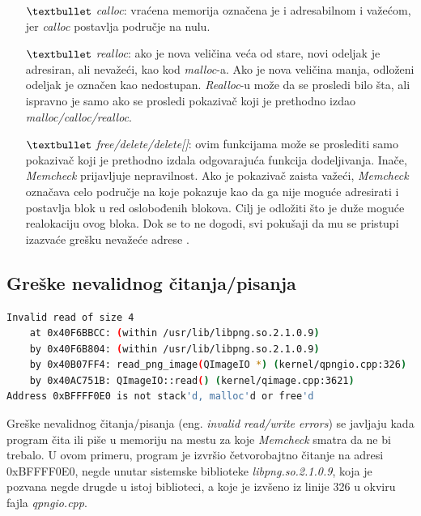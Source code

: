 \documentclass[12pt,oneside]{memoir}
\theoremstyle{plain}
\theoremstyle{definition}
\begin{document}
\begin{itemize}
\begin{itemize}
	\item[$\textbullet$] \textit{calloc}: vraćena memorija označena je i adresabilnom i važećom, jer \textit{calloc} postavlja područje na nulu.
	\item[$\textbullet$] \textit{realloc}: ako je nova veličina veća od stare, novi odeljak je adresiran, ali nevažeći, kao kod \textit{malloc}-a. Ako je nova veličina manja, odloženi odeljak je označen kao nedostupan. \textit{Realloc}-u može da se prosledi bilo šta, ali ispravno je samo ako se prosledi pokazivač koji je prethodno izdao \textit{malloc/calloc/realloc}.
	\item[$\textbullet$] \textit{free/delete/delete[]}: ovim funkcijama može se proslediti samo pokazivač koji je prethodno izdala odgovarajuća funkcija dodeljivanja. Inače, \textit{Memcheck} prijavljuje nepravilnost. Ako je pokazivač zaista važeći, \textit{Memcheck} označava celo područje na koje pokazuje kao da ga nije moguće adresirati i postavlja blok u red oslobođenih blokova. Cilj je odložiti što je duže moguće realokaciju ovog bloka. Dok se to ne dogodi, svi pokušaji da mu se pristupi izazvaće grešku nevažeće adrese \cite{ValgrindDOC}. 
	\end{itemize}
\end{itemize}

\subsection{Greške nevalidnog čitanja/pisanja}

\begin{lstlisting}[style=terminal,caption={Primer ispisa greške nevalidnog čitanja \cite{Memcheck}}, label={lst:slika2.3},language={bash}]   
Invalid read of size 4
    at 0x40F6BBCC: (within /usr/lib/libpng.so.2.1.0.9)
    by 0x40F6B804: (within /usr/lib/libpng.so.2.1.0.9)
    by 0x40B07FF4: read_png_image(QImageIO *) (kernel/qpngio.cpp:326)
    by 0x40AC751B: QImageIO::read() (kernel/qimage.cpp:3621)
Address 0xBFFFF0E0 is not stack'd, malloc'd or free'd
\end{lstlisting}

Greške nevalidnog čitanja/pisanja (eng. \textit{invalid read/write errors}) se javljaju kada program čita ili piše u memoriju na mestu za koje \textit{Memcheck} smatra da ne bi trebalo. U ovom primeru, program je izvršio četvorobajtno čitanje na adresi 0xBFFFF0E0, negde unutar sistemske biblioteke \textit{libpng.so.2.1.0.9}, koja je pozvana negde drugde u istoj biblioteci, a koje je izvšeno iz linije 326 u okviru fajla \textit{qpngio.cpp}.
\end{document}
